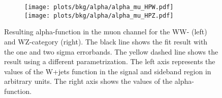 \begin{figure}
	\centering	
	\begin{subfigure}{\textwidth}	
		\texttt{[image: plots/bkg/alpha/alpha\_mu\_HPW.pdf]}
		\texttt{[image: plots/bkg/alpha/alpha\_mu\_HPZ.pdf]}
	\end{subfigure}
	\caption[Resulting alpha-function in the muon channel.]{Resulting alpha-function in the muon channel for the WW- (left) and WZ-category (right). The black line shows the fit result with the one and two sigma errorbands. The yellow dashed line shows the result using a different parametrization. The left axis represents the values of the W+jets function in the signal and sideband region in arbitrary units. The right axis shows the values of the alpha-function.}
	\label{fig:bkg:mwvmc_alpha_mu}
\end{figure}

